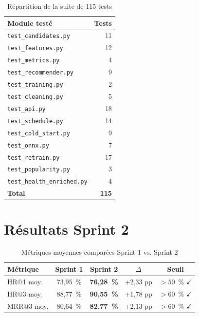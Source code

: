 \documentclass[12pt, a4paper]{report}
\begin{document}
\begin{table}[H]
\centering
\caption{Répartition de la suite de 115 tests}
\begin{tabular}{|l|r|}
\hline
\textbf{Module testé} & \textbf{Tests} \\
\hline
\texttt{test\_candidates.py}      & 11 \\
\hline
\texttt{test\_features.py}        & 12 \\
\hline
\texttt{test\_metrics.py}         & 4  \\
\hline
\texttt{test\_recommender.py}     & 9  \\
\hline
\texttt{test\_training.py}        & 2  \\
\hline
\texttt{test\_cleaning.py}        & 5  \\
\hline
\texttt{test\_api.py}             & 18 \\
\hline
\texttt{test\_schedule.py}        & 14 \\
\hline
\texttt{test\_cold\_start.py}     & 9  \\
\hline
\texttt{test\_onnx.py}            & 7  \\
\hline
\texttt{test\_retrain.py}         & 17 \\
\hline
\texttt{test\_popularity.py}      & 3  \\
\hline
\texttt{test\_health\_enriched.py}& 4  \\
\hline
\textbf{Total} & \textbf{115} \\
\hline
\end{tabular}
\end{table}

\section{Résultats Sprint 2}

\begin{table}[H]
\centering
\caption{Métriques moyennes comparées Sprint 1 vs. Sprint 2}
\label{tab:metrics-s2}
\begin{tabular}{|l|c|c|c|c|}
\hline
\textbf{Métrique} & \textbf{Sprint 1} & \textbf{Sprint 2} &
    \textbf{$\Delta$} & \textbf{Seuil} \\
\hline
HR@1 moy.  & 73{,}95~\% & \textbf{76{,}28~\%} & +2{,}33 pp &
    $> 50$~\% \textcolor{oncfOrange}{\textbf{$\checkmark$}} \\
\hline
HR@3 moy.  & 88{,}77~\% & \textbf{90{,}55~\%} & +1{,}78 pp &
    $> 60$~\% \textcolor{oncfOrange}{\textbf{$\checkmark$}} \\
\hline
MRR@3 moy. & 80{,}64~\% & \textbf{82{,}77~\%} & +2{,}13 pp &
    $> 60$~\% \textcolor{oncfOrange}{\textbf{$\checkmark$}} \\
\hline
\end{tabular}
\end{table}
\end{document}
